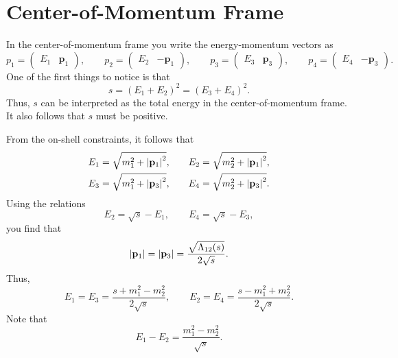 \section{Center-of-Momentum Frame}
In the center-of-momentum frame you write the energy-momentum vectors as
\begin{equation}
	p_{1} = \begin{pmatrix} E_{1} & \mathbf{p}_{1} \end{pmatrix}, \qquad p_{2} = \begin{pmatrix} E_{2} & -\mathbf{p}_{1} \end{pmatrix}, \qquad p_{3} = \begin{pmatrix} E_{3} & \mathbf{p}_{3} \end{pmatrix}, \qquad p_{4} = \begin{pmatrix} E_{4} & -\mathbf{p}_{3} \end{pmatrix}.
\end{equation}
One of the first things to notice is that
\begin{equation}
	s = (E_{1} + E_{2})^{2} = (E_{3} + E_{4})^{2}.
\end{equation}
Thus, $s$ can be interpreted as the total energy in the center-of-momentum frame. It also follows that $s$ must be positive.

From the on-shell constraints, it follows that
\begin{equation}
\begin{split}
	E_{1} = \sqrt{m_{1}^{2} + \left\lvert \mathbf{p}_{1} \right\rvert^{2}}, &\qquad E_{2} = \sqrt{m_{2}^{2} + \left\lvert \mathbf{p}_{1} \right\rvert^{2}}, \\
	E_{3} = \sqrt{m_{1}^{2} + \left\lvert \mathbf{p}_{3} \right\rvert^{2}}, &\qquad E_{4} = \sqrt{m_{2}^{2} + \left\lvert \mathbf{p}_{3} \right\rvert^{2}}.
\end{split}
\end{equation}
Using the relations
\begin{equation}
	E_{2} = \sqrt{s} - E_{1}, \qquad E_{4} = \sqrt{s} - E_{3},
\end{equation}
you find that
\begin{equation}
	\left\lvert \mathbf{p}_{1} \right\rvert = \left\lvert \mathbf{p}_{3} \right\rvert = \frac{\sqrt{\Lambda_{12}(s)}}{2 \sqrt{s}}.
\end{equation}
Thus,
\begin{equation}
	E_{1} = E_{3} = \frac{s + m_{1}^{2} - m_{2}^{2}}{2 \sqrt{s}}, \qquad E_{2} = E_{4} = \frac{s - m_{1}^{2} + m_{2}^{2}}{2 \sqrt{s}}.
\end{equation}
Note that
\begin{equation}
	E_{1} - E_{2} = \frac{m_{1}^{2} - m_{2}^{2}}{\sqrt{s}}.
\end{equation}
